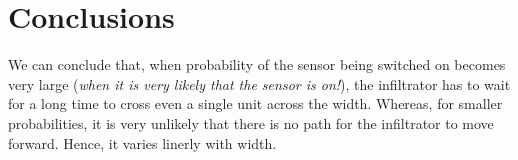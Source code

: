 \documentclass[12pt]{article}
\begin{document}
\section{Conclusions}\label{conclusions}
We can conclude that, when probability of the sensor being switched on becomes very large (\textit{when it is very likely that the sensor is on!}),
the infiltrator has to wait for a long time to cross even a single unit across the width. Whereas, for 
smaller probabilities, it is very unlikely that there is no path for the infiltrator to move forward.
Hence, it varies linerly with width.



\end{document}
